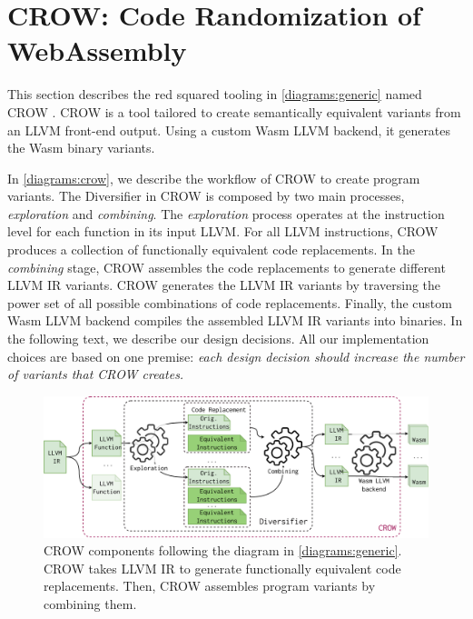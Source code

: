 
\section{CROW: Code Randomization of WebAssembly}
\label{section:crow}

This section describes the red squared tooling in \autoref{diagrams:generic} named CROW  \cite{CROW}. CROW is a tool tailored to create semantically equivalent \wasm variants from an LLVM front-end output.
Using a custom Wasm LLVM backend, it generates the Wasm binary variants.


In \autoref{diagrams:crow}, we describe the workflow of CROW to create program variants.
The Diversifier in CROW is composed by two main processes, \textit{exploration} and \textit{combining}. 
The \emph{exploration} process operates at the instruction level for each function in its input LLVM.
For all LLVM instructions, CROW produces a collection of functionally equivalent code replacements.   
In the \emph{combining} stage, CROW assembles the code replacements to generate different LLVM IR variants.
CROW generates the LLVM IR variants by traversing the power set of all possible combinations of code replacements.
Finally, the custom Wasm LLVM backend compiles the assembled LLVM IR variants into \wasm binaries.
In the following text, we describe our design decisions. All our implementation choices are based on one premise: \emph{each design decision should increase the number of \wasm variants that CROW creates.}

\begin{figure}[h]
    \includegraphics[width=\linewidth]{diagrams/generation/crow.drawio.pdf}
    \caption{CROW components following the diagram in \autoref{diagrams:generic}. CROW takes LLVM IR to generate functionally equivalent code replacements. Then, CROW assembles program variants by combining them.}
    \label{diagrams:crow}
\end{figure}


